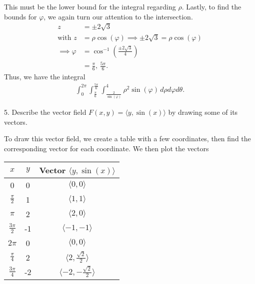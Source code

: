 \documentclass{report}
\begin{document}
    This must be the lower bound for the integral regarding $\rho$. Lastly, to find the bounds for $\varphi$, we again turn our attention to the intersection.
    \begin{align*}
        z&=\pm2\sqrt{3} \\
        \text{with } z &= \rho\cos{\left(\varphi\right)} \implies \pm2\sqrt{3} = \rho \cos{\left(\varphi\right)} \\
        \implies  \varphi &=\cos^{-1}{\left(\frac{\pm 2\sqrt{3}}{4}\right)} \\
                          &=\frac{\pi}{6},\, \frac{5\pi}{6}
    .\end{align*}
    Thus, we have the integral
    \begin{align*}
        \int_{0}^{2 \pi }\int_{\frac{\pi}{6}}^{\frac{5\pi}{6}}\int_{\frac{2}{\sin{\left(\varphi\right)} }}^{4} \rho^{2}\sin{\left(\varphi\right)} \, d\rho d\varphi d\theta 
    .\end{align*}

    \bigbreak \noindent 
    \begin{mdframed}
        5. Describe the vector field \(F(x, y) = \langle y, \sin(x) \rangle\) by drawing some of its vectors.
    \end{mdframed}
    \bigbreak \noindent 
    To draw this vector field, we create a table with a few coordinates, then find the corresponding vector for each coordinate. We then plot the vectors
    \bigbreak \noindent 
    \begin{center}
        \begin{tabular}{ccc}
            \hline
            \(x\) & \(y\) & Vector \(\langle y, \sin(x) \rangle\) \\ \hline
            0 & 0 & \(\langle 0, 0 \rangle\) \\
            \(\frac{\pi}{2}\) & 1 & \(\langle 1, 1 \rangle\) \\
            \(\pi\) & 2 & \(\langle 2, 0 \rangle\) \\
            \(\frac{3\pi}{2}\) & -1 & \(\langle -1, -1 \rangle\) \\
            \(2\pi\) & 0 & \(\langle 0, 0 \rangle\) \\
            \(\frac{\pi}{4}\) & 2 & \(\langle 2, \frac{\sqrt{2}}{2} \rangle\) \\
            \(\frac{3\pi}{4}\) & -2 & \(\langle -2, -\frac{\sqrt{2}}{2} \rangle\) \\ \hline
        \end{tabular}
    \end{center}
    \bigbreak \noindent 
\end{document}
